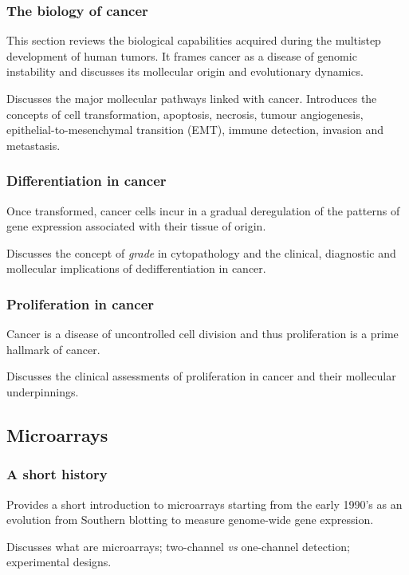 \documentclass[11pt]{article}
\begin{document}
\subsubsection{The biology of cancer}
\label{sec-1-2-2}
This section reviews the biological capabilities acquired during the multistep
development of human tumors. It frames cancer as a disease of genomic
instability and discusses its mollecular origin and evolutionary dynamics.

Discusses the major mollecular pathways linked with cancer. Introduces the
concepts of cell transformation, apoptosis, necrosis, tumour angiogenesis,
epithelial-to-mesenchymal transition (EMT), immune detection, invasion and
metastasis.

\subsubsection{Differentiation in cancer}
\label{sec-1-2-3}
Once transformed, cancer cells incur in a gradual deregulation of the patterns
of gene expression associated with their tissue of origin.

Discusses the concept of \emph{grade} in cytopathology and the clinical, diagnostic
and mollecular implications of dedifferentiation in cancer.

\subsubsection{Proliferation in cancer}
\label{sec-1-2-4}
Cancer is a disease of uncontrolled cell division and thus proliferation is a
prime hallmark of cancer.

Discusses the clinical assessments of proliferation in cancer and their
mollecular underpinnings.
\subsection{Microarrays}
\label{sec-1-3}
\subsubsection{A short history}
\label{sec-1-3-1}
Provides a short introduction to microarrays starting from the early 1990's as
an evolution from Southern blotting to measure genome-wide gene expression.

Discusses what are microarrays; two-channel \emph{vs} one-channel detection;
experimental designs.
\end{document}
